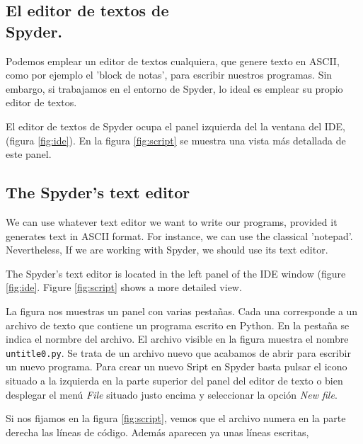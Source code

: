 \begin{paracol}{2}
\subsection{El editor de textos de\\ Spyder.} 
Podemos emplear un editor de textos cualquiera, que genere texto en ASCII, como por ejemplo el 'block de notas', para escribir nuestros programas. Sin embargo, si trabajamos en el entorno de Spyder, lo ideal es emplear su propio editor de textos.

El editor de textos de Spyder ocupa el panel izquierda del la ventana del IDE, (figura \ref{fig:ide}). En la figura \ref{fig:script} se muestra una vista más detallada de este panel.

\switchcolumn

\subsection{The Spyder's text editor}
We can use whatever text editor we want to write our programs, provided it generates text in ASCII format. For instance, we can use the classical 'notepad'. Nevertheless, If we are working with Spyder, we should use its text editor.

The Spyder's text editor is located in the left panel of the IDE window (figure \ref{fig:ide}. Figure \ref{fig:script} shows a more detailed view.

\switchcolumn
La figura nos muestras un panel con varias pestañas. Cada una corresponde a un archivo de texto que contiene un programa escrito en Python. En la pestaña se indica el normbre del archivo. El archivo visible en la figura muestra el nombre \texttt{untitle0.py}. Se trata de un archivo nuevo que acabamos de abrir para escribir un nuevo programa. Para crear un nuevo Sript en Spyder basta pulsar el icono situado a la izquierda en la parte superior del panel del editor de texto o bien desplegar el menú \emph{File} situado justo encima y seleccionar la opción \emph{New file}.

Si nos fijamos en la figura \ref{fig:script}, vemos que el archivo numera en la parte derecha las líneas de código. Además aparecen ya unas líneas escritas,


\end{paracol}
